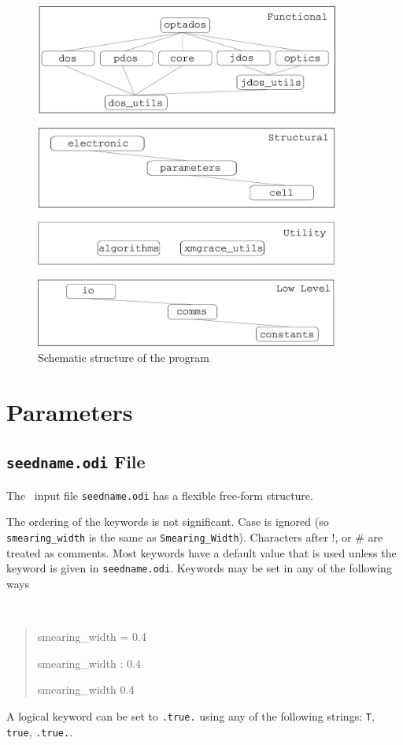 \documentclass[a4paper,11pt,twoside]{book}
\begin{document}
{\begin{figure}
\begin{center}
\includegraphics*[width=100mm]{./images/block_diag.eps}
\caption{Schematic structure of the program} \label{fig:prog_structure}
\end{center}
\end{figure}

\chapter{Parameters}\label{chap:parameters}

\section{{\tt seedname.odi} File}
The \optados\ input file {\tt seedname.odi} has a flexible free-form
structure. 

The ordering of the keywords is not significant. Case is ignored (so
\verb#smearing_width# is the same as \verb#Smearing_Width#). Characters after !, or \#
are treated as comments. Most keywords have a default value that is
used unless the keyword is given in {\tt seedname.odi}. Keywords may be set
in any of the following ways
{\tt
\begin{quote}
smearing\_width = 0.4

smearing\_width : 0.4

smearing\_width   0.4
\end{quote} }
A logical keyword can be set to {\tt .true.} using any of the following
strings: {\tt T}, {\tt true}, {\tt .true.}.


}
\end{document}
